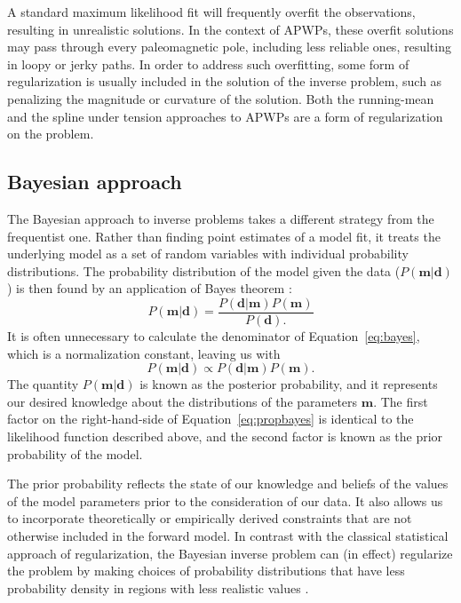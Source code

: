 \documentclass[11pt,letterpaper]{article}
\begin{document}
A standard maximum likelihood fit will frequently overfit the observations, resulting in unrealistic solutions. In the context of APWPs, these overfit solutions may pass through every paleomagnetic pole, including less reliable ones, resulting in loopy or jerky paths. In order to address such overfitting, some form of regularization is usually included in the solution of the inverse problem, such as penalizing the magnitude or curvature of the solution. Both the running-mean and the spline under tension approaches to APWPs are a form of regularization on the problem.

\subsection*{Bayesian approach}

The Bayesian approach to inverse problems takes a different strategy from the frequentist one. Rather than finding point estimates of a model fit, it treats the underlying model as a set of random variables with individual probability distributions. The probability distribution of the model given the data ($P(\mathbf{m} \vert \mathbf{d})$) is then found by an application of Bayes theorem \citep[cf.][]{Sivia2006a}:
\begin{equation}
P\left(\mathbf{m} \vert \mathbf{d} \right) = \frac{ P \left(\mathbf{d}\vert \mathbf{m} \right) P \left( \mathbf{m} \right) }{P \left( \mathbf{d}\right).}
\label{eq:bayes}
\end{equation}
It is often unnecessary to calculate the denominator of Equation~\eqref{eq:bayes}, which is a normalization constant, leaving us with
\begin{equation}
P\left(\mathbf{m} \vert \mathbf{d} \right) \propto P \left( \mathbf{d} \vert \mathbf{m} \right) P \left( \mathbf{m} \right).
\label{eq:propbayes}
\end{equation}
The quantity $P(\mathbf{m} \vert \mathbf{d})$ is known as the posterior probability, and it represents our desired knowledge about the distributions of the parameters $\mathbf{m}$. The first factor on the right-hand-side of Equation~\eqref{eq:propbayes} is identical to the likelihood function described above, and the second factor
is known as the prior probability of the model.

The prior probability reflects the state of our knowledge and beliefs of the values of the model parameters prior to the consideration of our data. It also allows us to incorporate theoretically or empirically derived constraints that are not otherwise included in the forward model. In contrast with the classical statistical approach of regularization, the Bayesian inverse problem can (in effect) regularize the problem by making
choices of probability distributions that have less probability density in regions with less realistic values \citep[e.g.][]{Minson2013a, Sambridge2013a}.
\end{document}
